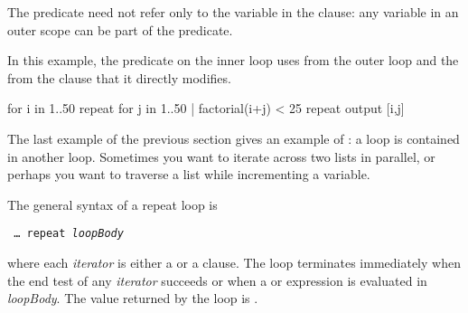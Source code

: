 {The predicate need not refer only to the variable in the  clause:
any variable in an outer scope can be part of the predicate.
\begin{xtc}
\begin{xtccomment}
In this example, the predicate on the inner  loop uses
 from the outer loop and the  from the 
clause that it directly modifies.
\end{xtccomment}
\begin{spadsrc}
for i in 1..50 repeat
  for j in 1..50 | factorial(i+j) < 25 repeat
    output [i,j]
\end{spadsrc}
\end{xtc}


The last example of
the previous section
gives an example of
: a loop is contained
in another loop.
Sometimes you want to iterate across two lists in parallel, or perhaps
you want to traverse a list while incrementing a variable.

\beginImportant
The general syntax of a repeat loop is
\begin{center}
{\tt {}  \ldots {} repeat {\it loopBody}}
\end{center}
where each {\it iterator} is either a  or a  clause.
The loop terminates immediately when the end test of any {\it iterator}
succeeds or when a  or  expression is evaluated
in {\it loopBody}.
The value returned by the loop is \void{}.
\endImportant

}

